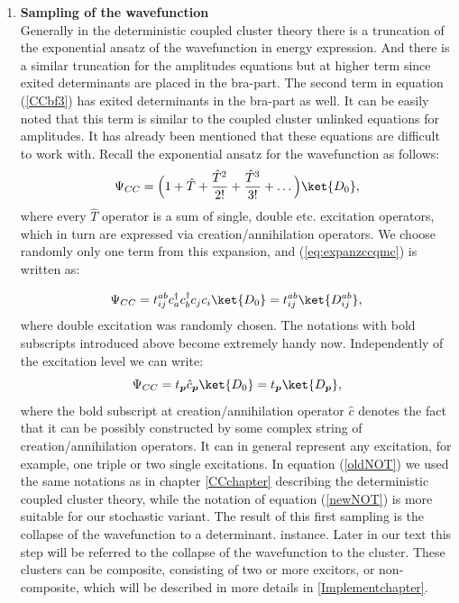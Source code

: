 \documentclass[twoside,english]{uiofysmaster}
\begin{document}
\begin{enumerate}
	\item
	\textbf{Sampling of the wavefunction}\\ Generally in the deterministic coupled cluster theory there is a truncation of the exponential ansatz of the wavefunction in energy expression. And there is a similar truncation for the amplitudes equations but at higher term since exited determinants are placed in the bra-part. The second term in equation (\ref{CCbf3}) has exited determinants in the bra-part as well. It can be easily noted that this term is similar to the coupled cluster unlinked equations for amplitudes. It has already been mentioned that these equations are difficult to work with. Recall the exponential ansatz for the wavefunction as follows:
	\begin{equation}\label{eq:expanzccqmc}
	\Psi_{CC} = \Big(1 + \hat{T} + \frac{\hat{T}^2}{2!} + \frac{\hat{T}^3}{3!} + \dots \Big)\ket{D_0},
	\end{equation}	
	where every $\hat{T}$ operator is a sum of single, double etc. excitation operators, which in turn are expressed via creation/annihilation operators. We choose randomly only one term from this expansion, and (\ref{eq:expanzccqmc}) is written as:
	
	\begin{equation}\label{oldNOT}
	\Psi_{CC} = t_{ij}^{ab} c^\dag_{a} c^\dag_{b} c_{j} c_{i}\ket{D_0} = t_{ij}^{ab} \ket{D_{ij}^{ab}},
	\end{equation}
	where double excitation was randomly chosen. The notations with bold subscripts introduced above become extremely handy now. Independently of the excitation level we can write: 
	\begin{equation}\label{newNOT}
	\Psi_{CC} = t_{\boldsymbol{p}} \hat{c}_{\boldsymbol{p}}\ket{D_0} = t_{\boldsymbol{p}} \ket{D_{\boldsymbol{p}}},
	\end{equation}	
	where the bold subscript at creation/annihilation operator $\hat{c}$ denotes the fact that it can be possibly constructed by some complex string of creation/annihilation operators. It can in general represent any excitation, for example, one triple or two single excitations. In equation (\ref{oldNOT}) we used the same notations as in chapter \ref{CCchapter} describing the deterministic coupled cluster theory, while the notation of equation (\ref{newNOT}) is more suitable for our stochastic variant.
	The result of this first sampling is the collapse of the wavefunction to a determinant.%
	instance.  Later in our text this step will be referred to the
	collapse of the wavefunction to the cluster. These clusters can be
	composite, consisting of two or more excitors, or non-composite, which
	will be described in more details in \autoref{Implementchapter}.
	

\end{enumerate}
\end{document}
